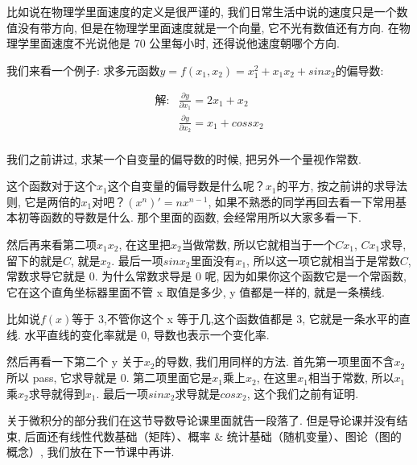 比如说在物理学里面速度的定义是很严谨的, 我们日常生活中说的速度只是一个数值没有带方向, 但是在物理学里面速度就是一个向量, 它不光有数值还有方向. 在物理学里面速度不光说他是 70 公里每小时, 还得说他速度朝哪个方向. 

我们来看一个例子: 求多元函数$y=f(x_1, x_2)=x_1^2 + x_1x_2 + sinx_2$的偏导数:

\begin{align*}
  \mbox{解}: & \frac{\partial y}{\partial x_1}=2x_1+x_2 \\
& \frac{\partial y}{\partial x_2}=x_1+cossx_2 \\
\end{align*}

我们之前讲过, 求某一个自变量的偏导数的时候, 把另外一个量视作常数. 

这个函数对于这个$x_1$这个自变量的偏导数是什么呢？$x_1$的平方, 按之前讲的求导法则, 它是两倍的$x_1$对吧？$(x^n)'=nx^{n-1}$, 如果不熟悉的同学再回去看一下常用基本初等函数的导数是什么. 那个里面的函数, 会经常用所以大家多看一下. 

然后再来看第二项$x_1x_2$, 在这里把$x_2$当做常数, 所以它就相当于一个$Cx_1$, $Cx_1$求导, 留下的就是$C$, 就是$x_2$. 最后一项$sinx_2$里面没有$x_1$, 所以这一项它就相当于是常数$C$, 常数求导它就是 0. 为什么常数求导是 0 呢, 因为如果你这个函数它是一个常函数, 它在这个直角坐标器里面不管 x 取值是多少, y 值都是一样的, 就是一条横线. 

比如说$f(x)$等于 3,不管你这个 x 等于几,这个函数值都是 3, 它就是一条水平的直线. 水平直线的变化率就是 0, 导数也表示一个变化率. 

然后再看一下第二个 y 关于$x_2$的导数, 我们用同样的方法. 首先第一项里面不含$x_2$所以 pass, 它求导就是 0. 第二项里面它是$x_1$乘上$x_2$, 在这里$x_1$相当于常数, 所以$x_1$乘$x_2$求导就得到$x_1$. 最后一项$sinx_2$求导就是$cosx_2$, 这个我们之前有证明. 

关于微积分的部分我们在这节导数导论课里面就告一段落了. 但是导论课并没有结束, 后面还有线性代数基础（矩阵）、概率 \& 统计基础（随机变量）、图论（图的概念）, 我们放在下一节课中再讲. 